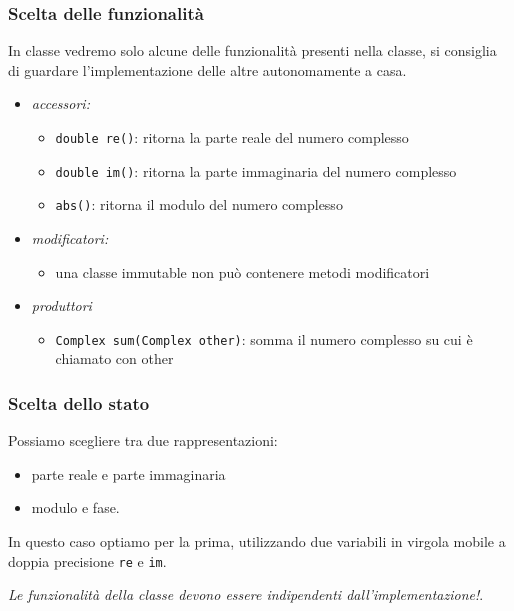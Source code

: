 \documentclass{article}
\begin{document}
\subsubsection{Scelta delle funzionalit\`a}
In classe vedremo solo alcune delle funzionalit\`a presenti nella classe, si consiglia di guardare l'implementazione delle altre autonomamente a casa.
\begin{itemize}
\item \emph{accessori:} 
\begin{itemize}
\item \texttt{double re()}: ritorna la parte reale del numero complesso
\item \texttt{double im()}: ritorna la parte immaginaria del numero complesso
\item \texttt{abs()}: ritorna il modulo del numero complesso
\end{itemize}
\item \emph{modificatori:}
\begin{itemize}
\item una classe immutable non pu\`o contenere metodi modificatori
\end{itemize}
\item \emph{produttori}
\begin{itemize}
\item \texttt{Complex sum(Complex other)}: somma il numero complesso su cui \`e chiamato con other
\end{itemize}
\end{itemize}


\subsubsection{Scelta dello stato}
Possiamo scegliere tra due rappresentazioni:
\begin{itemize}
\item parte reale e parte immaginaria 
\item modulo e fase.
\end{itemize}

In questo caso optiamo per la prima, utilizzando due variabili in virgola mobile a doppia precisione \texttt{re} e \texttt{im}.

\emph{Le funzionalità della classe devono essere indipendenti dall'implementazione!}.
\end{document}
